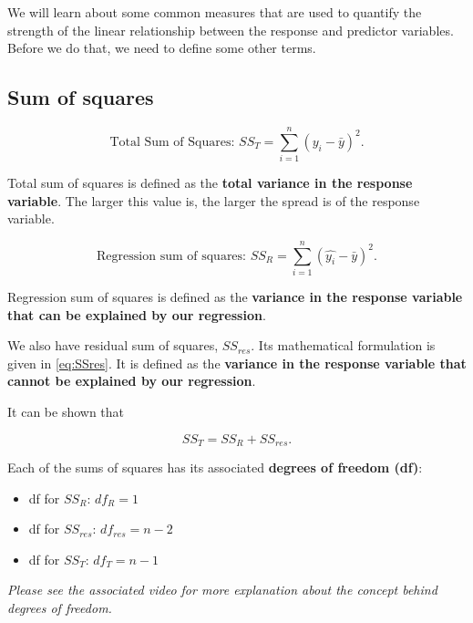 \documentclass[
]{book}
\providecommand{\tightlist}{%
  \setlength{\itemsep}{0pt}\setlength{\parskip}{0pt}}
\begin{document}
We will learn about some common measures that are used to quantify the strength of the linear relationship between the response and predictor variables. Before we do that, we need to define some other terms.

\hypertarget{sum-of-squares}{%
\subsection{Sum of squares}\label{sum-of-squares}}

\begin{equation} 
\text{Total Sum of Squares: } SS_T = \sum\limits_{i=1}^{n} (y_i - \bar{y})^{2}.
\label{eq:SST}
\end{equation}

Total sum of squares is defined as the \textbf{total variance in the response variable}. The larger this value is, the larger the spread is of the response variable.

\begin{equation} 
\text{Regression sum of squares: } SS_R = \sum\limits_{i=1}^{n} (\hat{y_i} - \bar{y})^{2}.
\label{eq:SSR}
\end{equation}

Regression sum of squares is defined as the \textbf{variance in the response variable that can be explained by our regression}.

We also have residual sum of squares, \(SS_{res}\). Its mathematical formulation is given in \eqref{eq:SSres}. It is defined as the \textbf{variance in the response variable that cannot be explained by our regression}.

It can be shown that

\begin{equation}
SS_T = SS_R + SS_{res}.
\label{eq:SS}
\end{equation}

Each of the sums of squares has its associated \textbf{degrees of freedom (df)}:

\begin{itemize}
\tightlist
\item
  df for \(SS_R\): \(df_R = 1\)
\item
  df for \(SS_{res}\): \(df_{res} = n-2\)
\item
  df for \(SS_T\): \(df_T = n-1\)
\end{itemize}

\emph{Please see the associated video for more explanation about the concept behind degrees of freedom.}
\end{document}
